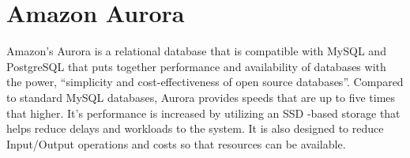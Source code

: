 \section{Amazon Aurora}

Amazon’s Aurora is a relational database that is compatible with MySQL and PostgreSQL that puts together performance and availability of databases with the power, “simplicity and cost-effectiveness of open source databases”\cite{Amazon-Aurora}. Compared to standard MySQL databases, Aurora provides speeds that are up to five times that higher. It’s performance is increased by utilizing an SSD -based storage that helps reduce delays and workloads to the system. It is also designed to reduce Input/Output operations and costs so that resources can be available.  

